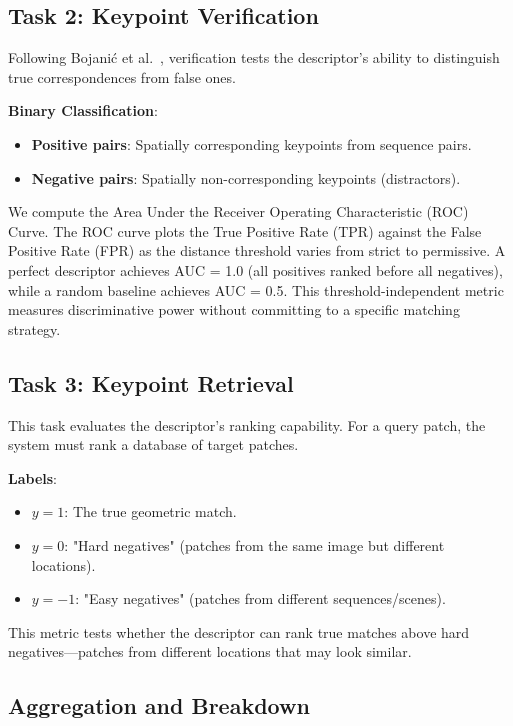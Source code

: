 \subsection{Task 2: Keypoint Verification}

Following Bojani\'{c} et al.~\cite{bojanic2020comparison}, verification tests the descriptor's ability to distinguish true correspondences from false ones.

\textbf{Binary Classification}:
\begin{itemize}
    \item \textbf{Positive pairs}: Spatially corresponding keypoints from sequence pairs.
    \item \textbf{Negative pairs}: Spatially non-corresponding keypoints (distractors).
\end{itemize}
We compute the Area Under the Receiver Operating Characteristic (ROC) Curve. The ROC curve plots the True Positive Rate (TPR) against the False Positive Rate (FPR) as the distance threshold varies from strict to permissive. A perfect descriptor achieves AUC = 1.0 (all positives ranked before all negatives), while a random baseline achieves AUC = 0.5. This threshold-independent metric measures discriminative power without committing to a specific matching strategy.

\subsection{Task 3: Keypoint Retrieval}

This task evaluates the descriptor's ranking capability. For a query patch, the system must rank a database of target patches.

\textbf{Labels}:
\begin{itemize}
    \item $y=1$: The true geometric match.
    \item $y=0$: "Hard negatives" (patches from the same image but different locations).
    \item $y=-1$: "Easy negatives" (patches from different sequences/scenes).
\end{itemize}
This metric tests whether the descriptor can rank true matches above hard negatives---patches from different locations that may look similar.

\subsection{Aggregation and Breakdown}

